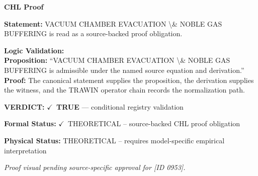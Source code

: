 \vspace{0.45em}
\noindent\textbf{CHL Proof}\par
\textbf{Statement:} VACUUM CHAMBER EVACUATION \textbackslash{}\& NOBLE GAS BUFFERING is read as a source-backed proof obligation.

\textbf{Logic Validation:}\\
\textbf{Proposition:} ``VACUUM CHAMBER EVACUATION \textbackslash{}\& NOBLE GAS BUFFERING is admissible under the named source equation and derivation.''\\
\textbf{Proof:} The canonical statement supplies the proposition, the derivation supplies the witness, and the TRAWIN operator chain records the normalization path.

\textbf{VERDICT:} \ensuremath{\checkmark}\ \textbf{TRUE} --- conditional registry validation

\textbf{Formal Status:} \ensuremath{\checkmark}\ THEORETICAL -- source-backed CHL proof obligation

\textbf{Physical Status:} THEORETICAL -- requires model-specific empirical interpretation
\par\vspace{0.45em}
\par
\vfill
\begingroup\footnotesize\itshape
Proof visual pending source-specific approval for [ID 0953].
\par\endgroup
\vfill
\endgroup
\endgroup
